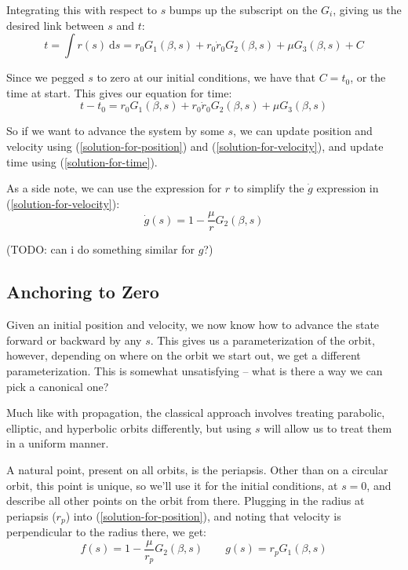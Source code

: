 \documentclass{article}
\newcommand{\dd}{\mathrm{d}}
\numberwithin{equation}{subsection}
\begin{document}
Integrating this with respect to $s$ bumps up the subscript on the $G_i$, giving us the desired link between $s$ and $t$:
\begin{equation}
t = \int r(s)~\dd s = r_0 G_1(\beta, s) + r_0 \dot{r}_0 G_2(\beta, s) + \mu G_3(\beta, s) + C
\end{equation}

Since we pegged $s$ to zero at our initial conditions, we have that $C = t_0$, or the time at start. This gives our equation for time:
\begin{equation}
\label{solution-for-time}
t - t_0 = r_0 G_1(\beta, s) + r_0 \dot{r}_0 G_2(\beta, s) + \mu G_3(\beta, s)
\end{equation}

So if we want to advance the system by some $s$, we can update position and velocity using (\ref{solution-for-position}) and (\ref{solution-for-velocity}), and update time using (\ref{solution-for-time}).

As a side note, we can use the expression for $r$ to simplify the $\dot g$ expression in (\ref{solution-for-velocity}):
\begin{equation}
\dot g(s) = 1 - \frac{\mu}{r} G_2(\beta, s)
\end{equation}

(TODO: can i do something similar for $g$?)


\subsection{Anchoring to Zero}

Given an initial position and velocity, we now know how to advance the state forward or backward by any $s$. This gives us a parameterization of the orbit, however, depending on where on the orbit we start out, we get a different parameterization. This is somewhat unsatisfying -- what is there a way we can pick a canonical one?

Much like with propagation, the classical approach involves treating parabolic, elliptic, and hyperbolic orbits differently, but using $s$ will allow us to treat them in a uniform manner.

A natural point, present on all orbits, is the periapsis. Other than on a circular orbit, this point is unique, so we'll use it for the initial conditions, at $s = 0$, and describe all other points on the orbit from there. Plugging in the radius at periapsis ($r_p$) into (\ref{solution-for-position}), and noting that velocity is perpendicular to the radius there, we get:
\begin{equation}
f(s) = 1 - \frac{\mu}{r_p} G_2(\beta, s) \qquad g(s) = r_p G_1(\beta, s)
\end{equation}
\end{document}
